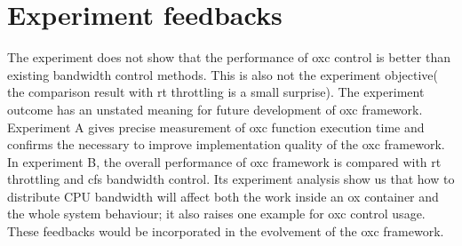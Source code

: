 \section{Experiment feedbacks}
The experiment does not show that the performance of oxc control is better than
existing bandwidth control methods. This is also not the experiment objective( the
comparison result with rt throttling is a small surprise). The experiment outcome
has an unstated meaning for future development of oxc framework.
Experiment A gives precise measurement of oxc function execution time and 
confirms the necessary to improve implementation quality of the oxc framework.
In experiment B, the overall performance of oxc framework is compared with
rt throttling and cfs bandwidth control. Its experiment analysis show us that
how to distribute CPU bandwidth will affect both the work inside an ox container
and the whole system behaviour; it also raises one example for oxc control usage. 
These feedbacks would be incorporated in the evolvement of the oxc framework.
